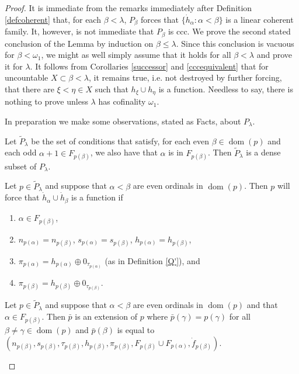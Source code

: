 \documentclass[10pt,a4paper]{amsart}
\def\dom{\operatorname{dom}}
\begin{document}
  \begin{proof}  It is immediate from the remarks immediately 
  after Definition \ref{defcoherent} that, for each $\beta <\lambda$,
   $P_\beta$ forces that $\{ \dot h_\alpha : \alpha < \beta\}$ is
    a linear coherent family. It, however, is not immediate
    that $P_\beta$ is ccc. We prove the second stated conclusion   
    of the Lemma by induction on $\beta \leq \lambda$. 
Since this conclusion is vacuous for $\beta < \omega_1$, we
might as well simply assume that it holds for all $\beta < \lambda$
and prove it for $\lambda$.  
It follows from Corollaries \ref{successor} and \ref{cccequivalent}
that for uncountable $X\subset \beta <\lambda$, it remains
true, i.e. not destroyed by further forcing,
that there are $\xi<\eta\in X$ such that
 $h_\xi\cup h_\eta$ is a function.
Needless to say, there is nothing to 
prove unless $\lambda$ has cofinality $\omega_1$. 

In preparation we make some observations, stated as Facts, about $P_\lambda$.

\begin{Fact} Let $ \tilde P_\lambda$ be the set of conditions that satisfy, for each
even $\beta\in \dom(p)$ and each odd $\alpha+1\in F_{p(\beta)}$,
 we also have that $\alpha$ is in $F_{p(\beta)}$.  Then
  $\tilde P_\lambda$ is a dense subset of $P_\lambda$.
\end{Fact}

 

\begin{Fact} Let   $p\in \tilde P_\lambda$ and suppose\label{fullfour}
that $\alpha <\beta$ are even ordinals in $\dom(p)$. Then $p$ will force
that $\dot h_\alpha\cup \dot h_\beta$ is a function if
\begin{enumerate}
\item $\alpha \in F_{p(\beta)}$,
\item $n_{p(\alpha)} = n_{p(\beta)}$, $s_{p(\alpha)} = s_{p(\beta)}$,
   $h_{p(\alpha)} = h_{p(\beta)}$,
   \item $\pi_{p(\alpha)} = h_{p(\alpha)} \oplus 0_{\tau_{p(\alpha)}}$ (as in Definition \ref{Q'}), and
   \item $\pi_{p(\beta)} = h_{p(\beta)} \oplus 0_{\tau_{p(\beta)}}$.
\end{enumerate}
\end{Fact}


\begin{Fact} Let   $p\in \tilde P_\lambda$ and suppose\label{addF}
that $\alpha <\beta$ are even ordinals in $\dom(p)$ and
that $\alpha\in F_{p(\beta)}$. Then $\bar p$ is an extension of $p$
where $\bar p(\gamma) = p(\gamma)$ for all $\beta\neq\gamma\in \dom(p)$
and 
 $\bar p(\beta)$ is equal to
 $
 ( n_{p(\beta)}, s_{p(\beta)}, \tau_{p(\beta)}, 
  h_{p(\beta)}, 
     \pi_{p(\beta)},   F_{p(\beta)}\cup F_{p(\alpha)}, \dot f_{p(\beta)})$.
\end{Fact}


\end{proof}
\end{document}
